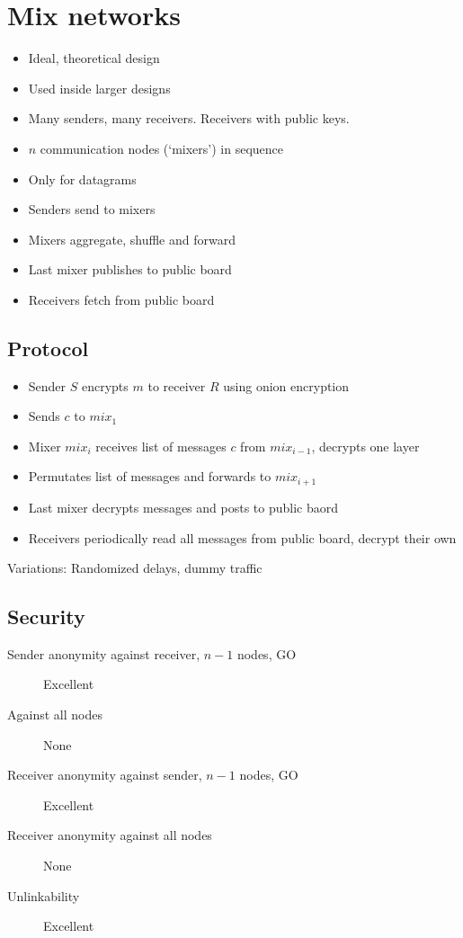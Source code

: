 \documentclass[a4paper]{scrreprt}
\begin{document}
\section{Mix networks}

\begin{itemize}
		\item Ideal, theoretical design
		\item Used inside larger designs
		\item Many senders, many receivers. Receivers with public keys.
		\item $n$ communication nodes (`mixers') in sequence
		\item Only for datagrams
		\item Senders send to mixers
		\item Mixers aggregate, shuffle and forward
		\item Last mixer publishes to public board
		\item Receivers fetch from public board
\end{itemize}

\subsection{Protocol}

\begin{itemize}
		\item Sender $S$ encrypts $m$ to receiver $R$ using onion encryption
		\item Sends $c$ to $mix_1$
		\item Mixer $mix_i$ receives list of messages $c$ from $mix_{i-1}$, decrypts one layer
		\item Permutates list of messages and forwards to $mix_{i+1}$
		\item Last mixer decrypts messages and posts to public baord
		\item Receivers periodically read all messages from public board, decrypt their own
\end{itemize}

Variations: Randomized delays, dummy traffic

\subsection{Security}

\begin{description}
		\item[Sender anonymity against receiver, $n-1$ nodes, GO] Excellent
		\item[Against all nodes] None
		\item[Receiver anonymity against sender, $n-1$ nodes, GO] Excellent
		\item[Receiver anonymity against all nodes] None
		\item[Unlinkability] Excellent
\end{description}
\end{document}
